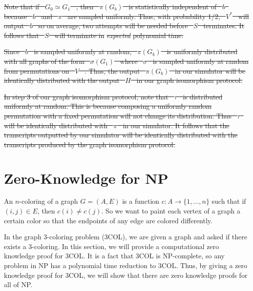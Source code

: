 \documentclass[12pt]{tufte-book}
\providecommand{\DIFdel}[1]{{\protect\color{red}\sout{#1}}}                      %
\providecommand{\DIFdelend}{} %
\DeclareRobustCommand{\DIFdelend}{\DIFOaddend \let\includegraphics\DIFOincludegraphics} %
\begin{document}
\DIFdel{Note that if \mbox{%
$G_0 \simeq G_1$
}%
, then \mbox{%
$\pi(G_b)$
}%
is statistically independent of \mbox{%
$b$
}%
because \mbox{%
$b$
}%
and \mbox{%
$\pi$
}%
are sampled uniformly. Thus, with probability 1/2, \mbox{%
$V^*$
}%
will output \mbox{%
$b$
}%
so on average, two attempts will be needed before \mbox{%
$S$
}%
terminates. It follows that \mbox{%
$S$
}%
will terminate in }\emph{\DIFdel{expected}} %
\DIFdel{polynomial time.
    }%

\DIFdel{Since \mbox{%
$b$
}%
is sampled uniformly at random, \mbox{%
$\pi (G_b)$
}%
is uniformly distributed with all graphs of the form \mbox{%
$\sigma (G_1)$
}%
where \mbox{%
$\sigma$
}%
is sampled uniformly at random from permutations on \mbox{%
$V$
}%
. Thus, the output \mbox{%
$\pi(G_b)$
}%
in our simulator will be identically distributed with the output \mbox{%
$H$
}%
in our graph isomorphism protocol.
    }%

\DIFdel{In step 3 of our graph isomorphism protocol, note that \mbox{%
$\tau$
}%
is distributed uniformly at random. This is because composing a uniformly random permutation with a fixed permutation will not change its distribution. Thus \mbox{%
$\tau$
}%
will be identically distributed with \mbox{%
$\pi$
}%
in our simulator. It follows that the transcripts outputted by our simulator will be identically distributed with the transcripts produced by the graph isomorphism protocol.
    }%

\DIFdelend \section{Zero-Knowledge for NP}

An $n$-coloring of a graph $G = (A, E)$ is a function $c: A \to \{1, \ldots, n \}$ such that if $(i, j) \in E$, then $c(i) \neq c(j)$. So we want to paint each vertex of a graph a certain color so that the endpoints of any edge are colored differently.

In the graph 3-coloring problem (3COL), we are given a graph and asked if there exists a 3-coloring. In this section, we will provide a computational zero knowledge proof for 3COL. It is a fact that 3COL is NP-complete, so any problem in NP has a polynomial time reduction to 3COL. Thus, by giving a zero knowledge proof for 3COL, we will show that there are zero knowledge proofs for all of NP.
\end{document}
